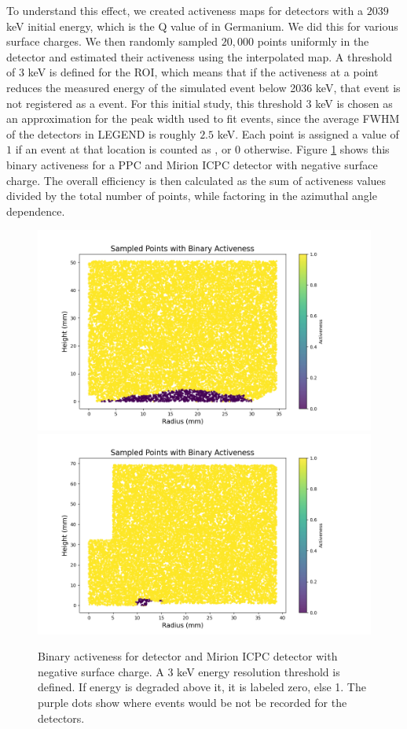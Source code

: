 To understand this effect, we created activeness maps for detectors with a $2039$ keV initial energy, which is the Q value of {\onbb} in Germanium. We did this for various surface charges. We then randomly sampled $20,000$ points uniformly in the detector and estimated their activeness using the interpolated map. A threshold of $3$ keV is defined for the ROI, which means that if the activeness at a point reduces the measured energy of the simulated {\onbb} event below 2036 keV, that event is not registered as a {\onbb} event. For this initial study, this threshold $3$ keV is chosen as an approximation for the peak width used to fit {\onbb} events, since the average FWHM of the detectors in LEGEND is roughly $2.5$ keV.  Each point is assigned a value of $1$ if an event at that location is counted as {\onbb}, or $0$ otherwise. Figure \ref{ch5_fig_binary_activenss} shows this binary activeness for a PPC and Mirion ICPC detector with negative surface charge. The overall efficiency is then calculated as the sum of activeness values divided by the total number of points, while factoring in the azimuthal angle dependence.



\begin{figure}%
\centering
\includegraphics[trim={1.5cm 0cm 6cm 1.77cm},clip,width=0.49\linewidth]{ch5/figs/bianry_act_ponama_1_-0.03.png}
\includegraphics[trim={1.5cm 0cm 6cm 1.77cm},clip,width=0.49\linewidth]{ch5/figs/bianry_act_V07647A_-0.03.png}
\caption{Binary activeness for {\ponama} detector and Mirion ICPC detector with negative surface charge. A $3$ keV energy resolution threshold is defined. If energy is degraded above it, it is labeled zero, else 1. The purple dots show where {\onbb} events would be not be recorded for the detectors.}
\label{ch5_fig_binary_activenss}
\end{figure}

